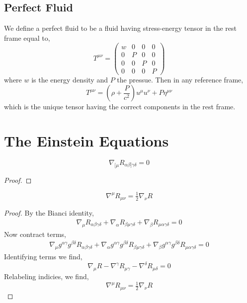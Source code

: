 \documentclass[11pt, a4paper]{article}
\begin{document}
\subsection{Perfect Fluid}

We define a perfect fluid to be a fluid having stress-energy tensor in the rest frame equal to,
\[ T^{\mu \nu} =
\begin{pmatrix}
w & 0 & 0 & 0
\\
0 & P & 0 & 0
\\
0 & 0 & P & 0
\\
0 & 0 & 0 & P
\end{pmatrix} \]
where $w$ is the energy density and $P$ the pressue. Then in any reference frame,
\[ T^{\mu \nu} = \left( \rho + \frac{P}{c^2} \right) u^\mu u^\nu + P \eta^{\mu \nu} \]
which is the unique tensor having the correct components in the rest frame. 

\section{The Einstein Equations}

\begin{theorem}[Bianchi]
\[ \nabla_{[\mu} R_{\alpha \beta ] \gamma \delta} = 0 \]
\end{theorem}


\begin{proof}

\end{proof}

\begin{corollary}
\[ \nabla^\mu R_{\mu \nu} = \tfrac{1}{2} \nabla_\nu R \]
\end{corollary}

\begin{proof}
By the Bianci identity,
\begin{align*}
\nabla_\mu R_{\alpha \beta \gamma \delta} + \nabla_\alpha R_{\beta \mu \gamma \delta} + \nabla_\beta R_{\mu \alpha \gamma \delta} = 0
\end{align*}
Now contract terms,
\begin{align*}
\nabla_\mu g^{\alpha \gamma} g^{\beta \delta} R_{\alpha \beta \gamma \delta} + \nabla_\alpha g^{\alpha \gamma} g^{\beta \delta} R_{\beta \mu \gamma \delta} + \nabla_\beta g^{\alpha \gamma} g^{\beta \delta} R_{\mu \alpha \gamma \delta} = 0
\end{align*}
Identifying terms we find,
\[ \nabla_\mu R - \nabla^\gamma R_{\mu \gamma} - \nabla^\delta R_{\mu \delta} = 0  \]
Relabeling indicies, we find,
\[ \nabla^\mu R_{\mu \nu} = \tfrac{1}{2} \nabla_\nu R \]
\end{proof}
\end{document}
